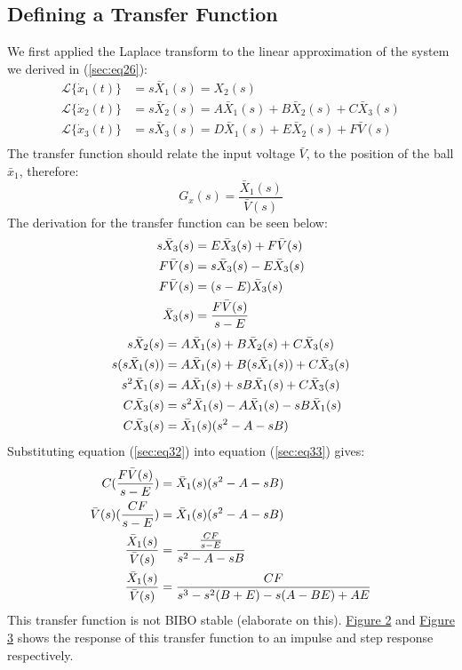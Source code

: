 \documentclass[a4paper,10pt,reqno]{amsart}
\numberwithin{equation}{section}
\newcommand{\lap}{\mathscr{L}}
\begin{document}
\subsection{Defining a Transfer Function} We first applied the Laplace transform to the linear approximation of the system we derived in (\ref{sec:eq26}):
\begin{align*}
    \lap\{\dot x_1(t)\} &= s\bar X_1(s) = X_2(s) \\
    \lap\{\dot x_2(t)\} &= s\bar X_2(s) = A\bar X_1(s)+B\bar X_2(s)+C\bar X_3(s) \\
    \lap\{\dot x_3(t)\} &= s\bar X_3(s) = D\bar X_1(s)+E\bar X_2(s)+F\bar V(s) \\
\end{align*}
The transfer function should relate the input voltage $\bar V$, to the position of the ball $\bar x_1$, therefore:
\begin{equation}
    G_x(s)=\frac{\bar X_1(s)}{\bar V(s)}
\end{equation}
The derivation for the transfer function can be seen below:
\begin{align}
\label{sec:eq32}
    \notag s\bar X_3(s) &= E\bar X_3(s)+F\bar V(s) \\
    \notag F\bar V(s) &= s\bar X_3(s)-E\bar X_3(s) \\
    \notag F\bar V(s) &= (s-E)\bar X_3(s) \\
    \bar X_3(s)&=\frac{F\bar V(s)}{s-E}
\end{align}
\begin{align}
\label{sec:eq33}
    \notag s\bar X_2(s) &= A\bar X_1(s)+B\bar X_2(s)+C\bar X_3(s) \\
    \notag s(s\bar X_1(s)) &= A\bar X_1(s)+B(s\bar X_1(s))+C\bar X_3(s) \\
    \notag s^2\bar X_1(s) &= A\bar X_1(s)+sB\bar X_1(s)+C\bar X_3(s) \\
    \notag C\bar X_3(s) &= s^2\bar X_1(s)-A\bar X_1(s)-sB\bar X_1(s) \\
    C\bar X_3(s) &= \bar X_1(s)(s^2-A-sB)
\end{align}
Substituting equation (\ref{sec:eq32}) into equation (\ref{sec:eq33}) gives:
\begin{align}
    \notag C(\frac{F\bar V(s)}{s-E}) &= \bar X_1(s)(s^2-A-sB) \\
    \notag \bar V(s)(\frac{CF}{s-E}) &= \bar X_1(s)(s^2-A-sB) \\
    \notag \frac{\bar X_1(s)}{\bar V(s)} &= \frac{\frac{CF}{s-E}}{s^2-A-sB} \\
    \frac{\bar X_1(s)}{\bar V(s)} &= \frac{CF}{s^3-s^2(B+E)-s(A-BE)+AE}
\end{align}
This transfer function is not BIBO stable (elaborate on this). \hyperref[fig:no_pid_imp]{Figure 2} and \hyperref[fig:no_pid_step]{Figure 3} shows the response of this transfer function to an impulse and step response respectively.
\end{document}
